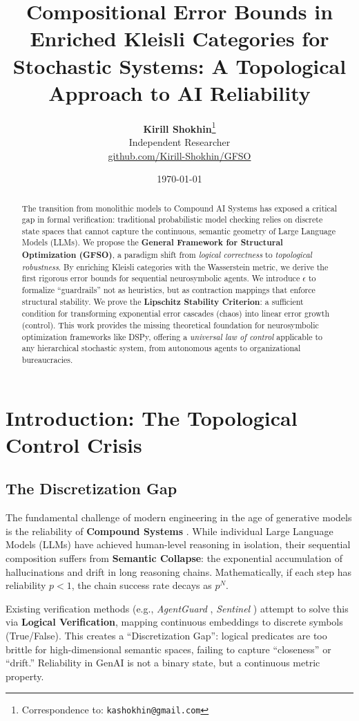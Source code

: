 \documentclass[11pt]{article}
\title{\textbf{Compositional Error Bounds in Enriched Kleisli Categories for Stochastic Systems: A Topological Approach to AI Reliability}}
\author{
  \textbf{Kirill Shokhin}\thanks{Correspondence to: \texttt{kashokhin@gmail.com}} \\
  Independent Researcher \\
  \href{https://github.com/Kirill-Shokhin/GFSO}{github.com/Kirill-Shokhin/GFSO}
}
\date{\today}
\theoremstyle{definition}
\begin{document}
\maketitle

\begin{abstract}
 The transition from monolithic models to Compound AI Systems has exposed a critical gap in formal verification: traditional probabilistic model checking relies on discrete state spaces that cannot capture the continuous, semantic geometry of Large Language Models (LLMs). We propose the \textbf{General Framework for Structural Optimization (GFSO)}, a paradigm shift from \textit{logical correctness} to \textit{topological robustness}. By enriching Kleisli categories with the Wasserstein metric, we derive the first rigorous error bounds for sequential neurosymbolic agents. We introduce $\epsilon$ to formalize ``guardrails'' not as heuristics, but as contraction mappings that enforce structural stability. We prove the \textbf{Lipschitz Stability Criterion}: a sufficient condition for transforming exponential error cascades (chaos) into linear error growth (control). This work provides the missing theoretical foundation for neurosymbolic optimization frameworks like DSPy, offering a \textit{universal law of control} applicable to any hierarchical stochastic system, from autonomous agents to organizational bureaucracies.
\end{abstract}

\section{Introduction: The Topological Control Crisis}

\subsection{The Discretization Gap}
 The fundamental challenge of modern engineering in the age of generative models is the reliability of \textbf{Compound Systems} \cite{zaharia2024}. While individual Large Language Models (LLMs) have achieved human-level reasoning in isolation, their sequential composition suffers from \textbf{Semantic Collapse}: the exponential accumulation of hallucinations and drift in long reasoning chains. Mathematically, if each step has reliability $p < 1$, the chain success rate decays as $p^N$.

Existing verification methods (e.g., \textit{AgentGuard} \cite{zhang2025}, \textit{Sentinel} \cite{liu2025}) attempt to solve this via \textbf{Logical Verification}, mapping continuous embeddings to discrete symbols (True/False). This creates a ``Discretization Gap'': logical predicates are too brittle for high-dimensional semantic spaces, failing to capture ``closeness'' or ``drift.'' Reliability in GenAI is not a binary state, but a continuous metric property.
\end{document}
